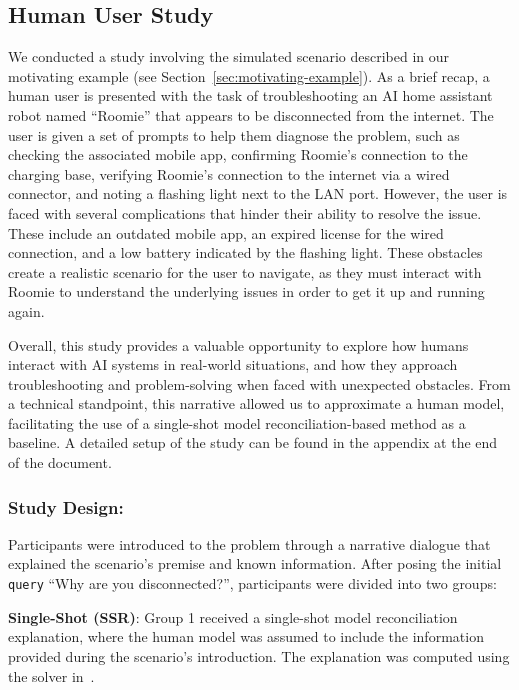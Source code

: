 \documentclass{article}
\begin{document}
\squishend











\subsection{Human User Study}
\label{sec:user-study}



We conducted a study involving the simulated scenario described in our motivating example (see Section~\ref{sec:motivating-example}). As a brief recap, a human user is presented with the task of troubleshooting an AI home assistant robot named ``Roomie'' that appears to be disconnected from the internet. The user is given a set of prompts to help them diagnose the problem, such as checking the associated mobile app, confirming Roomie's connection to the charging base, verifying Roomie's connection to the internet via a wired connector, and noting a flashing light next to the LAN port. However, the user is faced with several complications that hinder their ability to resolve the issue. These include an outdated mobile app, an expired license for the wired connection, and a low battery indicated by the flashing light. These obstacles create a realistic scenario for the user to navigate, as they must interact with Roomie to understand the underlying issues in order to get it up and running again.

Overall, this study provides a valuable opportunity to explore how humans interact with AI systems in real-world situations, and how they approach troubleshooting and problem-solving when faced with unexpected obstacles. From a technical standpoint, this narrative allowed us to approximate a human model, facilitating the use of a single-shot model reconciliation-based method as a baseline. A detailed setup of the study can be found in the appendix at the end of the document.


\subsubsection{Study Design:}
Participants were introduced to the problem through a narrative dialogue that explained the scenario's premise and known information. After posing the initial \texttt{query} ``Why are you disconnected?'', participants were divided into two groups:
\squishlist
    \item \textbf{Single-Shot (SSR)}: Group 1 received a single-shot model reconciliation explanation, where the human model was assumed to include the information provided during the scenario's introduction. The explanation was computed using the solver in~\citep{vas21}.
\end{document}
